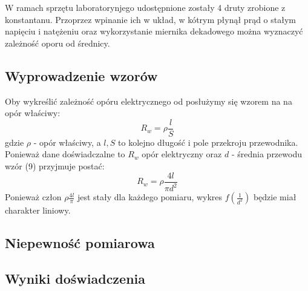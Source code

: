 \documentclass{article} %
\begin{document}
W ramach sprzętu laboratorynjego udostępnione zostały 4 druty zrobione z konstantanu. Przoprzez wpinanie ich w układ, w kótrym płynął prąd o stałym napięciu i natężeniu oraz wykorzystanie miernika dekadowego można wyznaczyć zależność oporu od średnicy.

\subsection{Wyprowadzenie wzorów}

Oby wykreślić zależność opóru elektrycznego od posłużymy się wzorem na na opór właściwy:
{\large
\begin{equation}
    R_w = \rho\frac{l}{S}
\end{equation}
}
gdzie $\rho$ - opór właściwy, a $l, S$ to kolejno długość i pole przekroju przewodnika. Ponieważ dane doświadczalne to $R_w$ opór elektryczny oraz $d$ - średnia przewodu wzór (9) przyjmuje postać:
{\large
\begin{equation}
    R_w = \rho\frac{4l}{\pi d^2}
\end{equation}
}
Ponieważ człon $\rho\frac{4l}{\pi}$ jest stały dla każdego pomiaru, wykres $f(\frac{1}{d^2})$ będzie miał charakter liniowy.
\subsection{Niepewność pomiarowa}

\subsection{Wyniki doświadczenia}

\begin{center}
\end{center}
\end{document}
